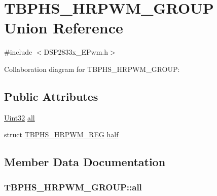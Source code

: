 \hypertarget{union_t_b_p_h_s___h_r_p_w_m___g_r_o_u_p}{}\section{T\+B\+P\+H\+S\+\_\+\+H\+R\+P\+W\+M\+\_\+\+G\+R\+O\+U\+P Union Reference}
\label{union_t_b_p_h_s___h_r_p_w_m___g_r_o_u_p}


{\ttfamily \#include $<$D\+S\+P2833x\+\_\+\+E\+Pwm.\+h$>$}



Collaboration diagram for T\+B\+P\+H\+S\+\_\+\+H\+R\+P\+W\+M\+\_\+\+G\+R\+O\+U\+P\+:
\subsection*{Public Attributes}
\begin{DoxyCompactItemize}
\item 
\hyperlink{_d_s_p2833x___device_8h_aba99025e657f892beb7ff31cecf64653}{Uint32} \hyperlink{union_t_b_p_h_s___h_r_p_w_m___g_r_o_u_p_a5e2d0438445f3ba4d7eed093f7394181}{all}
\item 
struct \hyperlink{struct_t_b_p_h_s___h_r_p_w_m___r_e_g}{T\+B\+P\+H\+S\+\_\+\+H\+R\+P\+W\+M\+\_\+\+R\+E\+G} \hyperlink{union_t_b_p_h_s___h_r_p_w_m___g_r_o_u_p_a4695304afa6ccac89d6c62f41d6a359b}{half}
\end{DoxyCompactItemize}


\subsection{Member Data Documentation}
\hypertarget{union_t_b_p_h_s___h_r_p_w_m___g_r_o_u_p_a5e2d0438445f3ba4d7eed093f7394181}{}
\subsubsection[{all}]{ T\+B\+P\+H\+S\+\_\+\+H\+R\+P\+W\+M\+\_\+\+G\+R\+O\+U\+P\+::all}\label{union_t_b_p_h_s___h_r_p_w_m___g_r_o_u_p_a5e2d0438445f3ba4d7eed093f7394181}
\hypertarget{union_t_b_p_h_s___h_r_p_w_m___g_r_o_u_p_a4695304afa6ccac89d6c62f41d6a359b}{}
